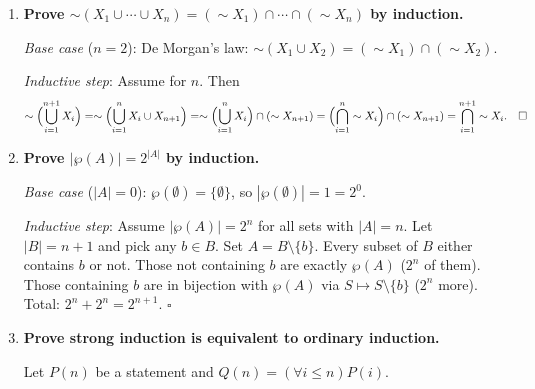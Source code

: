 \documentclass[11pt,openany]{book}
\begin{document}
\begin{enumerate}[{0.}1. ]
\textit{Base case} ($n=1$): $X\cap X_1 = X\cap X_1$. \checkmark

\textit{Inductive step}: Assume the result for $n$. Then
\begin{align*}
X\cap\Bigl(\bigcup_{i=1}^{n+1}X_i\Bigr)
&= X\cap\Bigl(\Bigl(\bigcup_{i=1}^n X_i\Bigr)\cup X_{n+1}\Bigr)\\
&= \Bigl(X\cap\bigcup_{i=1}^n X_i\Bigr)\cup(X\cap X_{n+1}) \quad\text{(distributivity for }n=2\text{)}\\
&= \Bigl(\bigcup_{i=1}^n(X\cap X_i)\Bigr)\cup(X\cap X_{n+1}) \quad\text{(inductive hypothesis)}\\
&= \bigcup_{i=1}^{n+1}(X\cap X_i). \quad\square
\end{align*}

\item \textbf{Prove $\sim(X_1\cup\cdots\cup X_n) = (\sim X_1)\cap\cdots\cap(\sim X_n)$ by induction.}

\textit{Base case} ($n=2$): De Morgan's law: $\sim(X_1\cup X_2)=(\sim X_1)\cap(\sim X_2)$. \checkmark

\textit{Inductive step}: Assume for $n$. Then
\[
\sim\Bigl(\bigcup_{i=1}^{n+1}X_i\Bigr) = \sim\Bigl(\bigcup_{i=1}^n X_i \cup X_{n+1}\Bigr) = \sim\Bigl(\bigcup_{i=1}^n X_i\Bigr)\cap(\sim X_{n+1}) = \Bigl(\bigcap_{i=1}^n\sim X_i\Bigr)\cap(\sim X_{n+1}) = \bigcap_{i=1}^{n+1}\sim X_i. \quad\square
\]

\item \textbf{Prove $|\wp(A)| = 2^{|A|}$ by induction.}

\textit{Base case} ($|A|=0$): $\wp(\emptyset)=\{\emptyset\}$, so $|\wp(\emptyset)|=1=2^0$. \checkmark

\textit{Inductive step}: Assume $|\wp(A)|=2^n$ for all sets with $|A|=n$. Let $|B|=n+1$ and pick any $b\in B$. Set $A=B\setminus\{b\}$. Every subset of $B$ either contains $b$ or not. Those not containing $b$ are exactly $\wp(A)$ ($2^n$ of them). Those containing $b$ are in bijection with $\wp(A)$ via $S\mapsto S\setminus\{b\}$ ($2^n$ more). Total: $2^n+2^n=2^{n+1}$. $\square$

\item \textbf{Prove strong induction is equivalent to ordinary induction.}

Let $P(n)$ be a statement and $Q(n) = (\forall i \leq n) P(i)$.


\end{enumerate}
\end{document}
